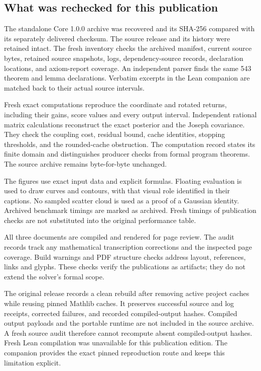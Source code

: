\subsection{What was rechecked for this publication}
The standalone Core 1.0.0 archive was recovered and its SHA-256 compared with its separately delivered checksum. The source release and its history were retained intact. The fresh inventory checks the archived manifest, current source bytes, retained source snapshots, logs, dependency-source records, declaration locations, and axiom-report coverage. An independent parser finds the same 543 theorem and lemma declarations. Verbatim excerpts in the Lean companion are matched back to their actual source intervals.

Fresh exact computations reproduce the coordinate and rotated returns, including their gains, score values and every output interval. Independent rational matrix calculations reconstruct the exact posterior and the Joseph covariance. They check the coupling cost, residual bound, cache identities, stopping thresholds, and the rounded-cache obstruction. The computation record states its finite domain and distinguishes producer checks from formal program theorems. The source archive remains byte-for-byte unchanged.

The figures use exact input data and explicit formulas. Floating evaluation is used to draw curves and contours, with that visual role identified in their captions. No sampled scatter cloud is used as a proof of a Gaussian identity. Archived benchmark timings are marked as archived. Fresh timings of publication checks are not substituted into the original performance table.

All three documents are compiled and rendered for page review. The audit records track any mathematical transcription corrections and the inspected page coverage. Build warnings and PDF structure checks address layout, references, links and glyphs. These checks verify the publications as artifacts; they do not extend the solver's formal scope.

The original release records a clean rebuild after removing active project caches while reusing pinned Mathlib caches. It preserves successful source and log receipts, corrected failures, and recorded compiled-output hashes. Compiled output payloads and the portable runtime are not included in the source archive. A fresh source audit therefore cannot recompute absent compiled-output hashes. Fresh Lean compilation was unavailable for this publication edition. The companion provides the exact pinned reproduction route and keeps this limitation explicit.

